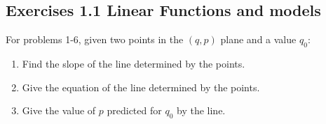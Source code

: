 \documentclass[10pt,]{book}
\theoremstyle{plain}
\theoremstyle{definition}
\begin{document}
\subsection[{Exercises 1.1 Linear Functions and models}]{Exercises 1.1 Linear Functions and models}\label{exercises-set-sec-1-1}
For problems 1-6, given two points in the \((q,p)\) plane and a value \(q_0\):%
\leavevmode%
\begin{enumerate}[label=(\alph*)]
\item\hypertarget{li-1}{}Find the slope of the line determined by the points.%
\item\hypertarget{li-2}{}Give the equation of the line determined by the points.%
\item\hypertarget{li-3}{}Give the value of \(p\) predicted for \(q_0\) by the line.%
\end{enumerate}
\end{document}
